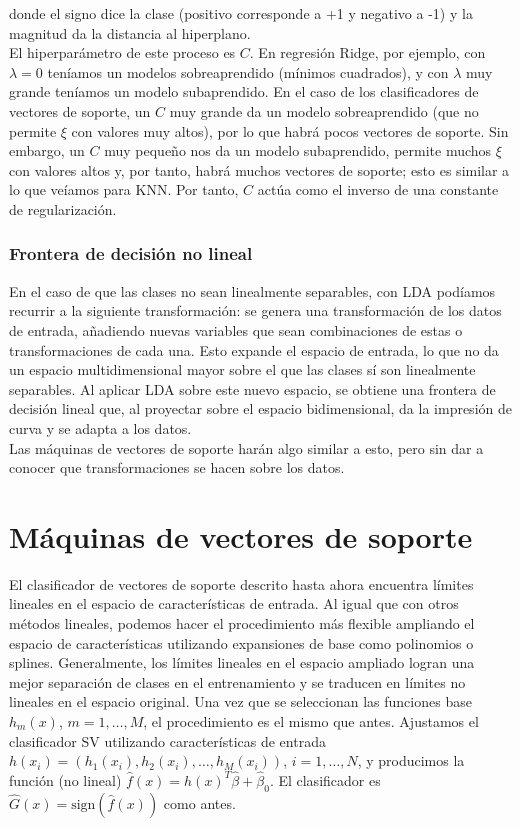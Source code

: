 donde el signo dice la clase (positivo corresponde a +1 y negativo a -1) y la magnitud da la distancia al hiperplano. \\

\noindent El hiperparámetro de este proceso es $C$. En regresión Ridge, por ejemplo, con $\lambda = 0$ teníamos un modelos sobreaprendido (mínimos cuadrados), y con $\lambda$ muy grande teníamos un modelo subaprendido. En el caso de los clasificadores de vectores de soporte, un $C$ muy grande da un modelo sobreaprendido (que no permite $\xi$ con valores muy altos), por lo que habrá pocos vectores de soporte. Sin embargo, un $C$ muy pequeño nos da un modelo subaprendido, permite muchos $\xi$ con valores altos y, por tanto, habrá muchos vectores de soporte; esto es similar a lo que veíamos para KNN. Por tanto, $C$ actúa como el inverso de una constante de regularización. \\


\subsubsection{Frontera de decisión no lineal}

En el caso de que las clases no sean linealmente separables, con LDA podíamos recurrir a la siguiente transformación: se genera una transformación de los datos de entrada, añadiendo nuevas variables que sean combinaciones de estas o transformaciones de cada una. Esto expande el espacio de entrada, lo que no da un espacio multidimensional mayor sobre el que las clases sí son linealmente separables. Al aplicar LDA sobre este nuevo espacio, se obtiene una frontera de decisión lineal que, al proyectar sobre el espacio bidimensional, da la impresión de curva y se adapta a los datos. \\

Las máquinas de vectores de soporte harán algo similar a esto, pero sin dar a conocer que transformaciones se hacen sobre los datos.

\section{Máquinas de vectores de soporte}

El clasificador de vectores de soporte descrito hasta ahora encuentra límites lineales en el espacio de características de entrada. Al igual que con otros métodos lineales, podemos hacer el procedimiento más flexible ampliando el espacio de características utilizando expansiones de base como polinomios o splines. Generalmente, los límites lineales en el espacio ampliado logran una mejor separación de clases en el entrenamiento y se traducen en límites no lineales en el espacio original. Una vez que se seleccionan las funciones base $h_m(x)$, $m = 1, \ldots, M$, el procedimiento es el mismo que antes. Ajustamos el clasificador SV utilizando características de entrada $h(x_i) = (h_1(x_i), h_2(x_i), \ldots, h_M(x_i))$, $i = 1, \ldots, N$, y producimos la función (no lineal) $\hat{f}(x) = h(x)^T \hat{\beta} + \hat{\beta}_0$. El clasificador es $\hat{G}(x) = \text{sign}(\hat{f}(x))$ como antes. \\

